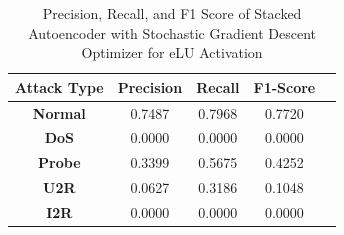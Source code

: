 \documentclass[12pt, a4paper]{report}
\begin{document}
\begin{table}[ht]
\centering
\captionsetup{justification=centering,margin=2cm}
\begin{tabular}{|c|c|c|c|c|}
\hline
\multicolumn{1}{|c|}{\textbf{Attack Type}} & \multicolumn{1}{c|}{\textbf{Precision}} & \multicolumn{1}{c|}{\textbf{Recall}} & \multicolumn{1}{c|}{\textbf{F1-Score}} \\ \hline
\textbf{Normal}        & 0.7487                                   & 0.7968                                & 0.7720                                                                  \\ \hline
\textbf{DoS}           & 0.0000                                  & 0.0000                                &  0.0000                                                                    \\ \hline
\textbf{Probe}         & 0.3399                                  & 0.5675                                & 0.4252                                                                  \\ \hline
\textbf{U2R}           & 0.0627                                    & 0.3186                                & 0.1048                                                                   \\ \hline
\textbf{I2R}           & 0.0000                                      & 0.0000                                   & 0.0000                                                            \\ \hline         \end{tabular}
\caption{Precision, Recall, and F1 Score of Stacked Autoencoder with Stochastic Gradient Descent Optimizer for eLU Activation}
\label{prf1_sgd_elu_auto}
\end{table}
\end{document}
